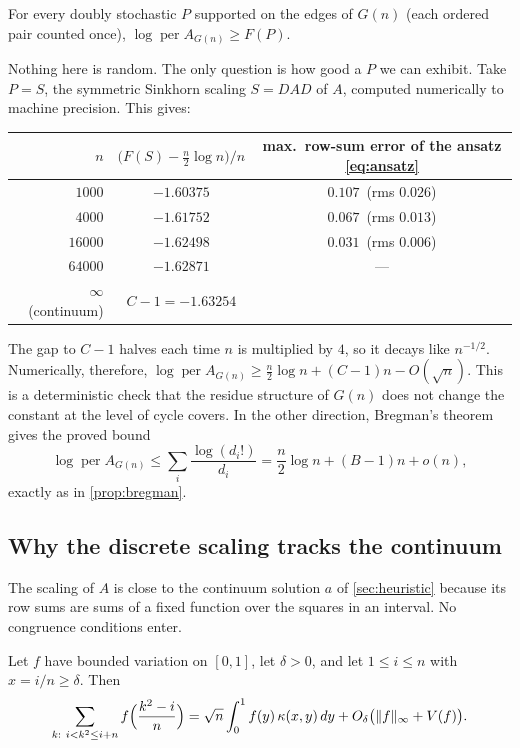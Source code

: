 \begin{corollary}\label{cor:bethe}
For every doubly stochastic $P$ supported on the edges of $G(n)$ (each ordered pair
counted once), $\log\operatorname{per}A_{G(n)}\ge F(P)$.
\end{corollary}

Nothing here is random. The only question is how good a $P$ we can exhibit. Take $P=S$,
the symmetric Sinkhorn scaling $S=DAD$ of $A$, computed numerically to machine precision.
This gives:

\begin{center}
\begin{tabular}{rcc}
\toprule
$n$ & $\bigl(F(S)-\frac n2\log n\bigr)/n$ & max.\ row-sum error of the ansatz \eqref{eq:ansatz}\\
\midrule
$1000$ & $-1.60375$ & $0.107$\ (rms $0.026$)\\
$4000$ & $-1.61752$ & $0.067$\ (rms $0.013$)\\
$16000$ & $-1.62498$ & $0.031$\ (rms $0.006$)\\
$64000$ & $-1.62871$ & ---\\
\midrule
$\infty$ (continuum) & $C-1=-1.63254$ &\\
\bottomrule
\end{tabular}
\end{center}

The gap to $C-1$ halves each time $n$ is multiplied by $4$, so it decays like $n^{-1/2}$.
Numerically, therefore,
$\log\operatorname{per}A_{G(n)}\ge\frac n2\log n+(C-1)n-O(\sqrt n)$. This is a
deterministic check that the residue structure of $G(n)$ does not change the constant
at the level of cycle covers. In the other direction, Bregman's theorem \cite{Bregman}
gives the proved bound
\[
\log\operatorname{per}A_{G(n)}\le\sum_i\frac{\log(d_i!)}{d_i}=\frac n2\log n+(B-1)n+o(n),
\]
exactly as in \cref{prop:bregman}.

\subsection{Why the discrete scaling tracks the continuum}
The scaling of $A$ is close to the continuum solution $a$ of \cref{sec:heuristic}
because its row sums are sums of a fixed function over the squares in an interval. No
congruence conditions enter.

\begin{lemma}\label{lem:squaresum}
Let $f$ have bounded variation on $[0,1]$, let $\delta>0$, and let $1\le i\le n$ with
$x=i/n\ge\delta$. Then
\[
\sum_{k:\ i<k^2\le i+n} f\Bigl(\frac{k^2-i}{n}\Bigr)
=\sqrt n\int_0^1 f(y)\,\kappa(x,y)\,dy+O_\delta\bigl(\|f\|_\infty+V(f)\bigr).
\]
\end{lemma}

